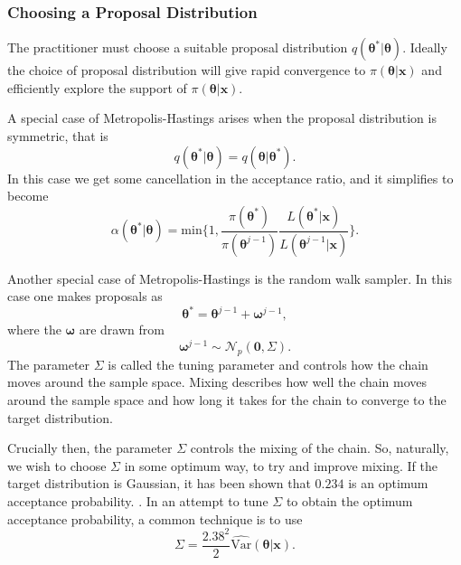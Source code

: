 \subsubsection*{Choosing a Proposal Distribution}
\label{sssec:proposal_distribution}
The practitioner must choose a suitable proposal distribution $q(\bm{\theta}^*|\bm{\theta})$. Ideally the choice of proposal distribution will give rapid convergence to $\pi(\bm{\theta}|\bm{x})$ and efficiently explore the support of $\pi(\bm{\theta}|\bm{x})$.

A special case of Metropolis-Hastings arises when the proposal distribution is symmetric, that is
\begin{equation*}
	q(\bm{\theta}^*|\bm{\theta}) = q(\bm{\theta}|\bm{\theta}^*).
\end{equation*}
In this case we get some cancellation in the acceptance ratio, and it simplifies to become 
\begin{equation*}
\alpha({\bm{\theta}}^*|\bm{\theta}) = \text{min}\bigg\{ 1, \frac{\pi({\bm{\theta}}^*)}{\pi({\bm{\theta}}^{j-1})} \frac{L(\bm{\theta}^*|\bm{x})}{L({\bm{\theta}}^{j-1}|\bm{x})} \bigg\}.
\end{equation*}

Another special case of Metropolis-Hastings is the random walk sampler. In this case one makes proposals as
\begin{equation*}
	\bm{\theta}^* = \bm{\theta}^{j-1} + \bm{\omega}^{j-1},
\end{equation*}
where the $\bm{\omega}$ are drawn from
\begin{equation*}
	\bm{\omega}^{j-1} \sim \mathcal{N}_p(\bm{0}, \Sigma).
\end{equation*}
The parameter $\Sigma$ is called the tuning parameter and controls how the chain moves around the sample space. Mixing describes how well the chain moves around the sample space and how long it takes for the chain to converge to the target distribution.

Crucially then, the parameter $\Sigma$ controls the mixing of the chain. So, naturally, we wish to choose $\Sigma$ in some optimum way, to try and improve mixing. If the target distribution is Gaussian, it has been shown that $0.234$ is an optimum acceptance probability. \citep{roberts01}. In an attempt to tune $\Sigma$ to obtain the optimum acceptance probability, a common technique is to use 
\begin{equation*}
	\Sigma = \frac{2.38^2}{2} \widehat{\text{Var}}(\bm{\theta}|\bm{x}).
\end{equation*}


